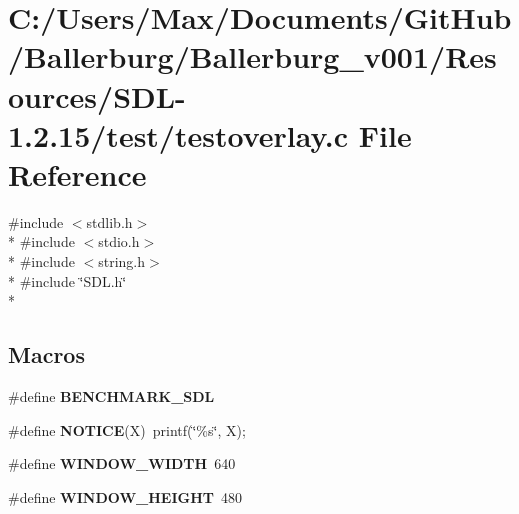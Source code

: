 \section{C\+:/\+Users/\+Max/\+Documents/\+Git\+Hub/\+Ballerburg/\+Ballerburg\+\_\+v001/\+Resources/\+S\+D\+L-\/1.2.15/test/testoverlay.c File Reference}
\label{testoverlay_8c}
{\ttfamily \#include $<$stdlib.\+h$>$}\\*
{\ttfamily \#include $<$stdio.\+h$>$}\\*
{\ttfamily \#include $<$string.\+h$>$}\\*
{\ttfamily \#include \char`\"{}S\+D\+L.\+h\char`\"{}}\\*
\subsection*{Macros}
\begin{DoxyCompactItemize}
\item 
\#define {\bf B\+E\+N\+C\+H\+M\+A\+R\+K\+\_\+\+S\+D\+L}
\item 
\#define {\bf N\+O\+T\+I\+C\+E}(X)~printf(\char`\"{}\%s\char`\"{}, X);
\item 
\#define {\bf W\+I\+N\+D\+O\+W\+\_\+\+W\+I\+D\+T\+H}~640
\item 
\#define {\bf W\+I\+N\+D\+O\+W\+\_\+\+H\+E\+I\+G\+H\+T}~480
\end{DoxyCompactItemize}

